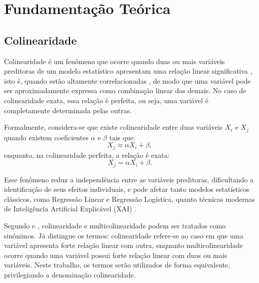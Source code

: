 
\chapter[Fundamentação Teórica]{Fundamentação Teórica}

\section{Colinearidade}\label{sec:colineariedade}

Colinearidade é um fenômeno que ocorre quando duas ou mais variáveis preditoras de um modelo estatístico apresentam uma relação linear significativa \cite{Carsten2012Collinearity}, isto é, quando estão altamente correlacionadas \cite{Das2019Analysis,Vatcheva2016Multicollinearity,Streukens2023Multicollinearity}, de modo que uma variável pode ser aproximadamente expressa como combinação linear das demais. No caso de colinearidade exata, essa relação é perfeita, ou seja, uma variável é completamente determinada pelas outras.

Formalmente, considera-se que existe colinearidade entre duas variáveis $X_i$ e $X_j$ quando existem coeficientes $\alpha$ e $\beta$ tais que:
\begin{equation}
	X_j \approx \alpha X_i + \beta,
\end{equation}
enquanto, na colinearidade perfeita, a relação é exata:
\begin{equation}
	X_j = \alpha X_i + \beta.
\end{equation}

Esse fenômeno reduz a independência entre as variáveis preditoras, dificultando a identificação de seus efeitos individuais, e pode afetar tanto modelos estatísticos clássicos, como Regressão Linear e Regressão Logística, quanto técnicas modernas de Inteligência Artificial Explicável (XAI) \cite{salih2025a_perpective}.

Segundo  e , colinearidade e multicolinearidade podem ser tratados como sinônimos. Já  distingue os termos: colinearidade refere-se ao caso em que uma variável apresenta forte relação linear com outra, enquanto multicolinearidade ocorre quando uma variável possui forte relação linear com duas ou mais variáveis. Neste trabalho, os termos serão utilizados de forma equivalente, privilegiando a denominação colinearidade.

